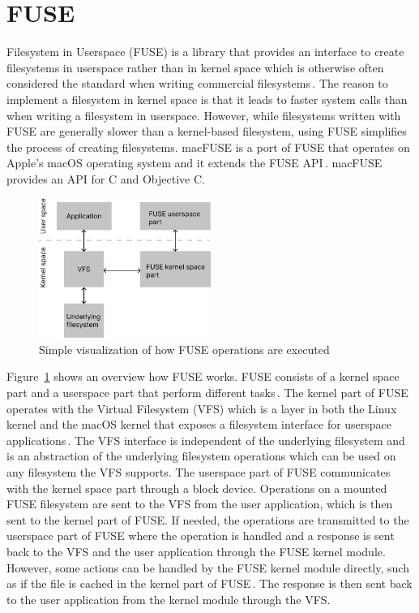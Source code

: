 \section{FUSE}
Filesystem in Userspace (FUSE) is a library that provides an interface to create filesystems in userspace rather than in kernel space which is otherwise often considered the standard when writing commercial filesystems\,\cite{Libfuse2021}. The reason to implement a filesystem in kernel space is that it leads to faster system calls than when writing a filesystem in userspace. However, while filesystems written with FUSE are generally slower than a kernel-based filesystem, using FUSE simplifies the process of creating filesystems. macFUSE is a port of FUSE that operates on Apple's macOS operating system and it extends the FUSE API\,\cite{HomeMacFUSE}. macFUSE provides an API for C and Objective C.

\begin{figure}[!ht]
	\begin{center}
	  \includegraphics[width=0.5\textwidth]{figures/fuse_description.png}
	\end{center}
	\caption{Simple visualization of how FUSE operations are executed}
	\label{fig:fuse_desc}
\end{figure}

Figure~\ref{fig:fuse_desc} shows an overview how FUSE works. FUSE consists of a kernel space part and a userspace part that perform different tasks\,\cite{vangoorFUSENotFUSE2017}. The kernel part of FUSE operates with the Virtual Filesystem (VFS) which is a layer in both the Linux kernel and the macOS kernel that exposes a filesystem interface for userspace applications\,\cite{goochOverviewLinuxVirtual, singhMacOSInternals2006}. The VFS interface is independent of the underlying filesystem and is an abstraction of the underlying filesystem operations which can be used on any filesystem the VFS supports. The userspace part of FUSE communicates with the kernel space part through a block device. Operations on a mounted FUSE filesystem are sent to the VFS from the user application, which is then sent to the kernel part of FUSE. If needed, the operations are transmitted to the userspace part of FUSE where the operation is handled and a response is sent back to the VFS and the user application through the FUSE kernel module. However, some actions can be handled by the FUSE kernel module directly, such as if the file is cached in the kernel part of FUSE\,\cite{vangoorFUSENotFUSE2017}. The response is then sent back to the user application from the kernel module through the VFS.